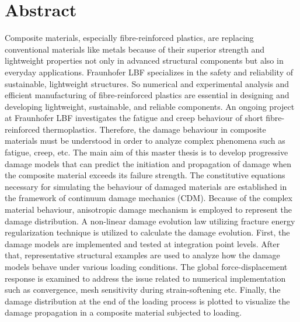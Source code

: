 \documentclass[12pt,a4paper,twoside,openright]{report}
\begin{document}


\clearpage
\thispagestyle{empty}
\hfill
\clearpage
{}
\vspace*{2cm}
\section*{\LARGE{Abstract} }
\pagestyle{empty}
\indent\indent\indent Composite materials, especially fibre-reinforced plastics, are replacing conventional materials like metals because of their superior strength and lightweight properties not only in advanced structural components but also in everyday applications. Fraunhofer LBF specializes in the safety and reliability of sustainable, lightweight structures. So numerical and experimental analysis and efficient manufacturing of fibre-reinforced plastics are essential in designing and developing lightweight, sustainable, and reliable components. An ongoing project at Fraunhofer LBF investigates the fatigue and creep behaviour of short fibre-reinforced thermoplastics. Therefore, the damage behaviour in composite materials must be understood in order to analyze complex phenomena such as fatigue, creep, etc. The main aim of this master thesis is to develop progressive damage models that can predict the initiation and propagation of damage when the composite material exceeds its failure strength. The constitutive equations necessary for simulating the behaviour of damaged materials are established in the framework of continuum damage mechanics (CDM). Because of the complex material behaviour, anisotropic damage mechanism is employed to represent the damage distribution. A non-linear damage evolution law utilizing fracture energy regularization technique is utilized to calculate the damage evolution.  First, the damage models are implemented and tested at integration point levels. After that, representative structural examples are used to analyze how the damage models behave under various loading conditions. The global force-displacement response is examined to address the issue related to numerical implementation such as convergence, mesh sensitivity during strain-softening etc. Finally, the damage distribution at the end of the loading process is plotted to visualize the damage propagation in a composite material subjected to loading.



\clearpage
\thispagestyle{empty}
\hfill
\clearpage
\vspace*{2cm}
\end{document}
